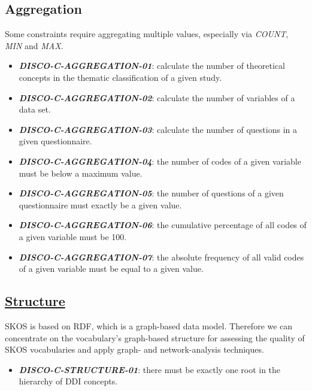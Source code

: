 \documentclass{llncs}
\begin{document}
\subsection{Aggregation}

Some constraints require aggregating multiple values, especially via \emph{COUNT}, \emph{MIN} and \emph{MAX}.

\begin{itemize}
	\item \textbf{{\em DISCO-C-AGGREGATION-01}}: calculate the number of theoretical concepts in the thematic classification of a given study.
  \item \textbf{{\em DISCO-C-AGGREGATION-02}}: calculate the number of variables of a data set.
	\item \textbf{{\em DISCO-C-AGGREGATION-03}}: calculate the number of questions in a given questionnaire.
	\item \textbf{{\em DISCO-C-AGGREGATION-04}}: the number of codes of a given variable must be below a maximum value.
	\item \textbf{{\em DISCO-C-AGGREGATION-05}}: the number of questions of a given questionnaire must exactly be a given value.
	\item \textbf{{\em DISCO-C-AGGREGATION-06}}: the cumulative percentage of all codes of a given variable must be 100.
  \item \textbf{{\em DISCO-C-AGGREGATION-07}}: the absolute frequency of all valid codes of a given variable must be equal to a given value.
\end{itemize} 

\subsection{\underline{Structure}}

SKOS is based on RDF, which is a graph-based data model. Therefore we can concentrate on the vocabulary's graph-based structure for assessing the quality of SKOS vocabularies and apply graph- and network-analysis techniques. 

\begin{itemize}
	\item \textbf{{\em DISCO-C-STRUCTURE-01}}: there must be exactly one root in the hierarchy of DDI concepts. 
\end{itemize} 
\end{document}
